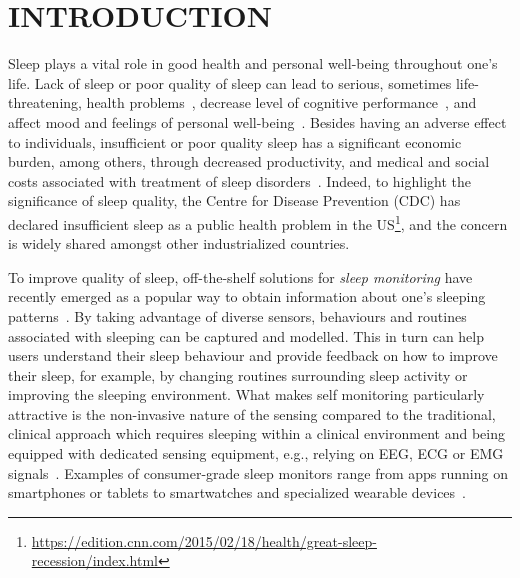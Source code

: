 \section{INTRODUCTION}\label{sec:1introduction}

Sleep plays a vital role in good health and personal well-being throughout one's life. Lack of sleep or poor quality of sleep can lead to
serious, sometimes life-threatening, health problems~\cite{altena2008sleep,chandola2010effect,lallukka2016contribution}, decrease level of cognitive performance~\cite{alhola07sleep,akerstedt07altered}, and affect mood and feelings of personal well-being~\cite{paunio09longitudinal,pilcher97sleep}.
Besides having an adverse effect to individuals, insufficient or poor quality sleep has a significant economic burden, among others, through decreased productivity, and medical and social costs associated with treatment of sleep disorders~\cite{hafner17why}. Indeed, to highlight the significance of sleep quality, the Centre for Disease Prevention (CDC) has declared insufficient sleep
as a public health problem in the US\footnote{\url{https://edition.cnn.com/2015/02/18/health/great-sleep-recession/index.html}}, and the concern is widely shared amongst other industrialized countries.

To improve quality of sleep, off-the-shelf solutions for \emph{sleep monitoring} have recently emerged as a popular way to obtain information about one's sleeping patterns~\cite{ko15consumer,shelgikar2016sleep}. By taking advantage of diverse sensors, behaviours and routines associated with sleeping can be captured and modelled. This in turn can help users understand their sleep behaviour and provide feedback on how to improve their sleep, for example, by changing routines surrounding sleep activity or improving the sleeping environment. What makes self monitoring particularly attractive is the non-invasive nature of the sensing compared to the traditional, clinical approach which requires sleeping within a clinical environment and being equipped with dedicated sensing equipment, e.g., relying on EEG, ECG or EMG signals~\cite{ebrahimi2008automatic,saper2005hypothalamic,oropesa1999sleep,langkvist2012sleep}. Examples of consumer-grade sleep monitors range from apps running on smartphones or tablets to smartwatches and 
specialized wearable devices~\cite{zeo,Jawbone,SleepAndroid,fitbit,gu2016sleep,sleepmonitor}. 


